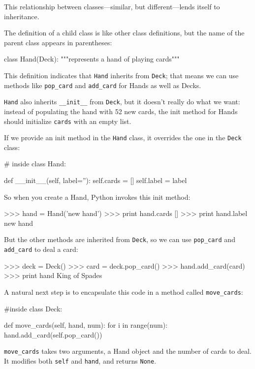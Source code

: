 This relationship between classes---similar, but different---lends
itself to inheritance.  

The definition of a child class is like other class definitions,
but the name of the parent class appears in parentheses:


\beforeverb
\begin{pycode}
class Hand(Deck):
    """represents a hand of playing cards"""
\end{pycode}
\afterverb
%
This definition indicates that {\tt Hand} inherits from {\tt Deck};
that means we can use methods like \verb"pop_card" and \verb"add_card"
for Hands as well as Decks.

{\tt Hand} also inherits \verb"__init__" from {\tt Deck}, but
it doesn't really do what we want: instead of populating the hand
with 52 new cards, the init method for Hands should initialize
{\tt cards} with an empty list.


If we provide an init method in the {\tt Hand} class, it overrides the
one in the {\tt Deck} class:

\beforeverb
\begin{pycode}
# inside class Hand:

    def __init__(self, label=''):
        self.cards = []
        self.label = label
\end{pycode}
\afterverb
%
So when you create a Hand, Python invokes this init method:

\beforeverb
\begin{pyinterpreter}
>>> hand = Hand('new hand')
>>> print hand.cards
[]
>>> print hand.label
new hand
\end{pyinterpreter}
\afterverb
%
But the other methods are inherited from {\tt Deck}, so we can use
\verb"pop_card" and \verb"add_card" to deal a card:

\beforeverb
\begin{pyinterpreter}
>>> deck = Deck()
>>> card = deck.pop_card()
>>> hand.add_card(card)
>>> print hand
King of Spades
\end{pyinterpreter}
\afterverb
%
A natural next step is to encapsulate this code in a method
called \verb"move_cards":


\beforeverb
\begin{pycode}
#inside class Deck:

    def move_cards(self, hand, num):
        for i in range(num):
            hand.add_card(self.pop_card())
\end{pycode}
\afterverb
%
\verb"move_cards" takes two arguments, a Hand object and the number of
cards to deal.  It modifies both {\tt self} and {\tt hand}, and
returns {\tt None}.

